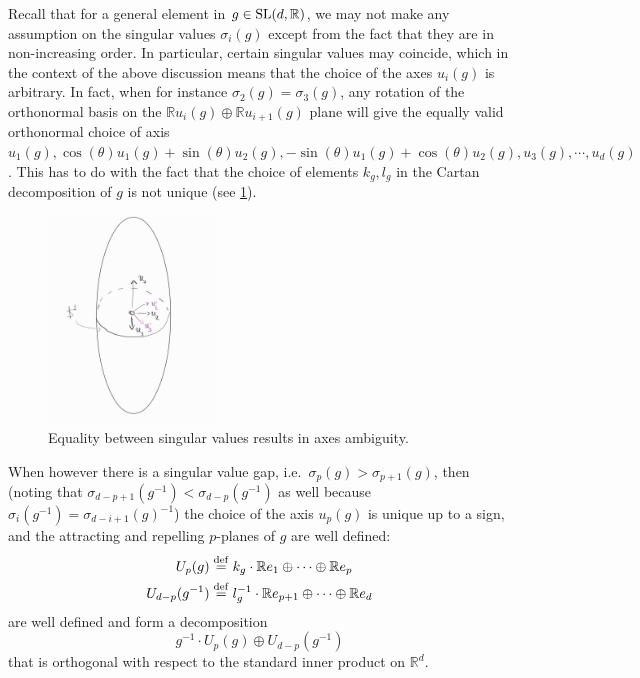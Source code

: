 \documentclass{report}
\begin{document}
Recall that for a general element in $g \in \operatorname{{\mathrm{SL}}}(d, \mathbb R)$, we may not make any assumption on the singular values $\sigma_i(g)$ except from the fact that they are in non-increasing order.
In particular, certain singular values may coincide, which in the context of the above discussion means that the choice of the axes $u_i(g)$ is arbitrary.
In fact, when for instance $\sigma_2(g) = \sigma_3(g)$, any rotation of the orthonormal basis on the $\mathbb R u_i(g) \oplus \mathbb R u_{i+1}(g)$ plane will give the equally valid orthonormal choice of axis $u_1(g), \cos(\theta) u_1(g) + \sin(\theta) u_2(g), -\sin(\theta) u_1(g) + \cos(\theta) u_2(g), u_3(g), \cdots, u_d(g)$.
This has to do with the fact that the choice of elements $k_g, l_g$ in the Cartan decomposition of $g$ is not unique (see \cref{fig:arbitrary_axis}).
\begin{figure}[h]
    \centering
    \includegraphics[width=0.4\textwidth]{arbitrary_axis.jpg}
    \caption{Equality between singular values results in axes ambiguity.}
    \label{fig:arbitrary_axis}
\end{figure}

When however there is a singular value gap, i.e.\ $\sigma_p(g) > \sigma_{p+1}(g)$, then (noting that $\sigma_{d-p+1}(g^{-1}) < \sigma_{d-p}(g^{-1})$ as well because $\sigma_i(g^{-1}) = \sigma_{d-i + 1}(g)^{-1}$) the choice of the axis $u_p(g)$ is unique up to a sign, and the attracting and repelling $p$-planes of $g$ are well defined:
\begin{align*}
    U_p(g) &\overset{\mathrm{def}}{=} k_g \cdot \mathbb R e_1 \oplus \cdots \oplus \mathbb R e_p\\
    U_{d-p}(g^{-1}) &\overset{\mathrm{def}}{=} l_g^{-1} \cdot \mathbb R e_{p+1} \oplus \cdots \oplus \mathbb R e_d\\
\end{align*}
are well defined and form a decomposition
\[
    g^{-1} \cdot U_p(g) \oplus U_{d-p}(g^{-1})
\]
that is orthogonal with respect to the standard inner product on $\mathbb R^d$.
\end{document}
